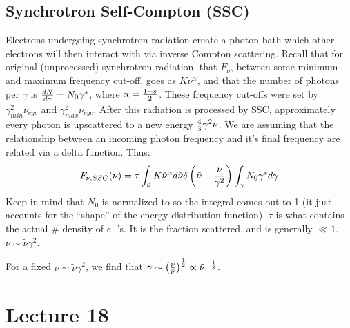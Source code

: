 \documentclass[11pt]{article}
\def\hf{{1 \over 2}}
\begin{document}
\subsection*{ Synchrotron Self-Compton (SSC)}

Electrons undergoing synchrotron radiation create a photon bath which
other electrons will then interact with via inverse Compton scattering.  Recall
that for original (unprocessed) synchrotron radiation, that $F_\nu$, between
some minimum and maximum frequency cut-off, goes as $K\nu^\alpha$, and that
the number of photons per $\gamma$ is ${dN\over d\gamma}=N_0\gamma^s$, where
$\alpha={1+s\over2}$.  These frequency cut-offs were set by $\gamma_{min}^2
\nu_{cyc}$ and $\gamma_{max}^2\nu_{cyc}$.  After this radiation is processed
by SSC, approximately every photon is upscattered to a new energy
${4\over3}\gamma^2\nu$.  We are assuming that the relationship between
an incoming photon frequency and it's final frequency are related via a
delta function.  Thus:
\def\tn{{\tilde\nu}}
$$F_{\nu,SSC}(\nu)=\tau\int_{\tn}{K\tn^\alpha d\tn\delta\left(\tn-
{\nu\over\gamma^2}\right)\int_\gamma{N_0\gamma^sd\gamma}}$$
Keep in mind that $N_0$ is normalized to so the integral comes out to 1
(it just accounts for the 
``shape'' of the energy distribution function). $\tau$ is what contains the actual
\# density of $e^-$'s.  It is the fraction scattered,
and is generally $\ll1$. $\nu\sim\tn\gamma^2$.\par
For a fixed $\nu\sim\tn\gamma^2$, we find that $\gamma\sim\left({\nu\over
\tn}\right)^\hf\propto\tn^{-\hf}$.

\section*{ Lecture 18 }
\end{document}
